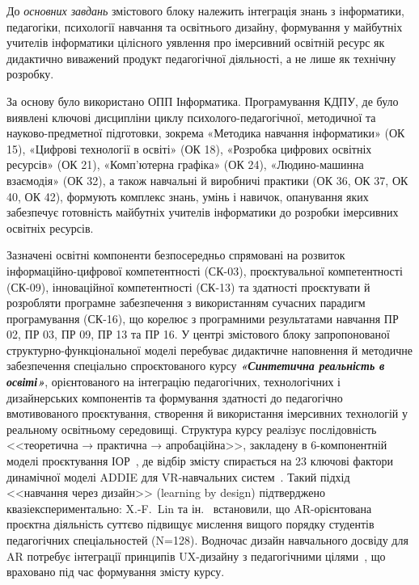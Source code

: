 До \emph{основних завдань} змістового блоку належить інтеграція знань з інформатики, педагогіки, психології навчання та освітнього дизайну, формування у майбутніх учителів інформатики цілісного уявлення про імерсивний освітній ресурс як дидактично виважений продукт педагогічної діяльності, а не лише як технічну розробку.

За основу було використано ОПП Інформатика. Програмування КДПУ, де було виявлені ключові дисципліни циклу психолого-педагогічної, методичної та науково-предметної підготовки, зокрема «Методика навчання інформатики» (ОК 15), «Цифрові технології в освіті» (ОК 18), «Розробка цифрових освітніх ресурсів» (ОК 21), «Комп'ютерна графіка» (ОК 24), «Людино-машинна взаємодія» (ОК 32), а також навчальні й виробничі практики (ОК 36, ОК 37, ОК 40, ОК 42), формують комплекс знань, умінь і навичок, опанування яких забезпечує готовність майбутніх учителів інформатики до розробки імерсивних освітніх ресурсів.

Зазначені освітні компоненти безпосередньо спрямовані на розвиток інформаційно-цифрової компетентності (СК-03), проєктувальної компетентності (СК-09), інноваційної компетентності (СК-13) та здатності проєктувати й розробляти програмне забезпечення з використанням сучасних парадигм програмування (СК-16), що корелює з програмними результатами навчання ПР 02, ПР 03, ПР 09, ПР 13 та ПР 16. У центрі змістового блоку запропонованої структурно-функціональної моделі перебуває дидактичне наповнення й методичне забезпечення спеціально спроєктованого курсу \emph{\textbf{«Синтетична реальність в освіті»}}, орієнтованого на інтеграцію педагогічних, технологічних і дизайнерських компонентів та формування здатності до педагогічно вмотивованого проєктування, створення й використання імерсивних технологій у реальному освітньому середовищі. Структура курсу реалізує послідовність <<теоретична → практична → апробаційна>>, закладену в 6-компонентній моделі проєктування ІОР~\cite{Semerikov2022IERDesign}, де відбір змісту спирається на 23 ключові фактори динамічної моделі ADDIE для VR-навчальних систем~\cite{Li2024ADDIE}. Такий підхід <<навчання через дизайн>> (learning by design) підтверджено квазіекспериментально: X.-F.~Lin та ін.~\cite{Lin2024ARLearningByDesign} встановили, що AR-орієнтована проєктна діяльність суттєво підвищує мислення вищого порядку студентів педагогічних спеціальностей (N=128). Водночас дизайн навчального досвіду для AR потребує інтеграції принципів UX-дизайну з педагогічними цілями~\cite{Czerkawski2021LXD}, що враховано під час формування змісту курсу.

